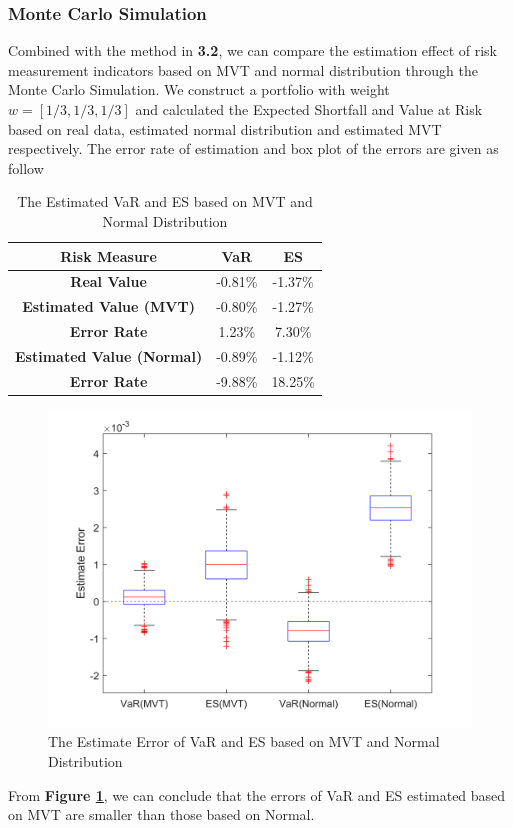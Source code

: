\subsubsection{Monte Carlo Simulation}
Combined with the method in \textbf{3.2}, we can compare the estimation effect of risk measurement indicators based on MVT and normal distribution through the Monte Carlo Simulation. We construct a portfolio with weight $w=[1/3,1/3,1/3]$ and calculated the Expected Shortfall and Value at Risk based on real data, estimated normal distribution and estimated MVT respectively. The error rate of estimation and box plot of the errors are given as follow
\begin{table}[H]
    \centering
    \begin{tabular}{|c|c|c|}
    \hline
    {\bf Risk Measure} &  {\bf VaR} &   {\bf ES} \\
    \hline
    {\bf Real Value} &    -0.81\% &    -1.37\% \\
    \hline
    {\bf Estimated Value (MVT)} &    -0.80\% &    -1.27\% \\
    \hline
    {\bf Error Rate} &     1.23\% &     7.30\% \\
    \hline
    {\bf Estimated Value (Normal)} &    -0.89\% &    -1.12\% \\
    \hline
    {\bf Error Rate} &    -9.88\% &    18.25\% \\
    \hline
    \end{tabular}  
    \caption{The Estimated VaR and ES based on MVT and Normal Distribution}
    \label{Tab2}
\end{table}
\begin{figure}[H]
    \centering
    \includegraphics[scale=0.9]{Figure/FIG4-MC.png}
    \caption{The Estimate Error of VaR and ES based on MVT and Normal Distribution}
    \label{Fig4}
\end{figure}
From \textbf{Figure \ref{Fig4}}, we can conclude that the errors of VaR and ES estimated based on MVT are smaller than those based on Normal.